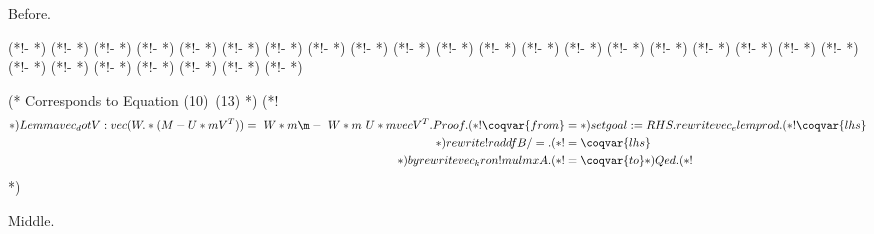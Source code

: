 \documentclass{article}
\begin{document}
Before.

\begin{coq_example}
(*!- \coqadd{\*:}{ } *)
(*!- \coqadd{:\*}{ } *)
(*!-  *)
(*!-  *)
(*!-  *)
(*!-  *)
(*!-  *)
(*!- \coqadd{\.\*}{\odot} *)
(*!-  *)
(*!-  *)
(*!- \coqadd{\\\\d}{\partial} *)
(*!-  *)
(*!-  *)
(*!-  *)
(*!-  *)
(*!- \coqadd{\^\+}{^\dagger} *)
(*!-  *)
(*!- \coqadd{\^-\s*(\w+)}{^{-\1}} *)
(*!-  *)
(*!-  *)
(*!-  *)
(*!-  *)
(*!-  *)
(*!-  *)
(*!-  *)
(*!- \coqadd{\bv\b}{\nu} *)
(*!-  *)


(* Corresponds to Equation (10)~(13) *)
(*! \begin{align} *)
Lemma vec_dot V : vec (W .* (M - U *m V^T)) = ~W *m \m - ~W *m ~U *m vec V^T.
Proof.
  (*! \coqvar{from} &=  *)
  set goal := RHS.
  rewrite vec_elemprod.
  (*! \coqvar{lhs} \\ *)
  rewrite !raddfB /=.
  (*! &= \coqvar{lhs} \\ *)
  by rewrite vec_kron !mulmxA.
  (*! &= \coqvar{to} \label{eq:\coqvar{name}} *)
Qed.
(*! \end{align} *)

\end{coq_example}

Middle.
\end{document}
